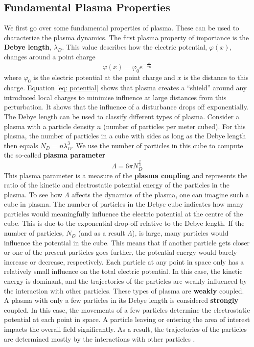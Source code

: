 \subsection{Fundamental Plasma Properties}
\label{subsec: intro plasma characteristics}
We first go over some fundamental properties of plasma. These can be used to characterize the plasma dynamics. 
The first plasma property of importance is the \textbf{Debye length}, $\lambda_D$. This value describes how the electric potential, $\varphi(x)$, changes around a point charge
\begin{equation}
\label{eq: potential}
    \varphi(x) = \varphi_0 e^{-\frac{x}{\lambda_D}}
\end{equation} 
where $\varphi_0$ is the electric potential at the point charge and $x$ is the distance to this charge. 
Equation \ref{eq: potential} shows that plasma creates a ``shield'' around any introduced local charges to minimise influence at large distances from this perturbation. It shows that the influence of a disturbance drops off exponentially. The Debye length can be used to classify different types of plasma. 
Consider a plasma with a particle density $n$ (number of particles per meter cubed). For this plasma, the number of particles in a cube with sides as long as the Debye length then equals $N_{D} = n \lambda_D^3$. We use the number of particles in this cube to compute the so-called \textbf{plasma parameter}
\begin{equation}
    \Lambda = 6 \pi N_D^{\frac{2}{3}}
\end{equation}
This plasma parameter is a measure of the \textbf{plasma coupling} and represents the ratio of the kinetic and electrostatic potential energy of the particles in the plasma. To see how $\Lambda$ affects the dynamics of the plasma, one can imagine such a cube in plasma. The number of particles in the Debye cube indicates how many particles would meaningfully influence the electric potential at the centre of the cube. This is due to the exponential drop-off relative to the Debye length. If the number of particles, $N_D$ (and as a result $\Lambda$), is large, many particles would influence the potential in the cube. This means that if another particle gets closer or one of the present particles goes further, the potential energy would barely increase or decrease, respectively. Each particle at any point in space only has a relatively small influence on the total electric potential. In this case, the kinetic energy is dominant, and the trajectories of the particles are weakly influenced by the interaction with other particles. These types of plasma are \textbf{weakly} coupled.
 A plasma with only a few particles in its Debye length is considered \textbf{strongly} coupled. In this case, the movements of a few particles determine the electrostatic potential at each point in space. A particle leaving or entering the area of interest impacts the overall field significantly. As a result, the trajectories of the particles are determined mostly by the interactions with other particles \cite{chen_introduction_1984, chen_lecture_2003}.
 
